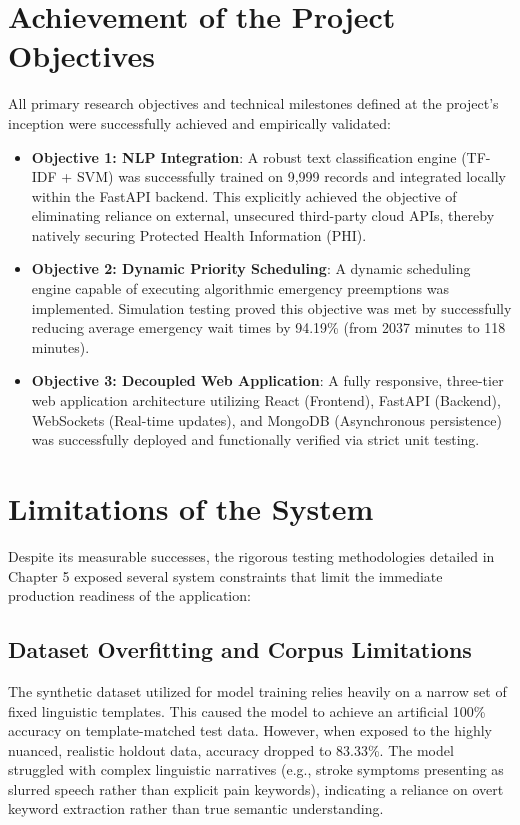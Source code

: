 \documentclass[12pt,a4paper]{report}
\begin{document}
\section{Achievement of the Project Objectives}
All primary research objectives and technical milestones defined at the project's inception were successfully achieved and empirically validated:
\begin{itemize}
    \item \textbf{Objective 1: NLP Integration}: A robust text classification engine (TF-IDF + SVM) was successfully trained on 9,999 records and integrated locally within the FastAPI backend. This explicitly achieved the objective of eliminating reliance on external, unsecured third-party cloud APIs, thereby natively securing Protected Health Information (PHI).
    \item \textbf{Objective 2: Dynamic Priority Scheduling}: A dynamic scheduling engine capable of executing algorithmic emergency preemptions was implemented. Simulation testing proved this objective was met by successfully reducing average emergency wait times by 94.19\% (from 2037 minutes to 118 minutes).
    \item \textbf{Objective 3: Decoupled Web Application}: A fully responsive, three-tier web application architecture utilizing React (Frontend), FastAPI (Backend), WebSockets (Real-time updates), and MongoDB (Asynchronous persistence) was successfully deployed and functionally verified via strict unit testing.
\end{itemize}

\section{Limitations of the System}
Despite its measurable successes, the rigorous testing methodologies detailed in Chapter 5 exposed several system constraints that limit the immediate production readiness of the application:

\subsection{Dataset Overfitting and Corpus Limitations}
The synthetic dataset utilized for model training relies heavily on a narrow set of fixed linguistic templates. This caused the model to achieve an artificial 100\% accuracy on template-matched test data. However, when exposed to the highly nuanced, realistic holdout data, accuracy dropped to 83.33\%. The model struggled with complex linguistic narratives (e.g., stroke symptoms presenting as slurred speech rather than explicit pain keywords), indicating a reliance on overt keyword extraction rather than true semantic understanding.
\end{document}
